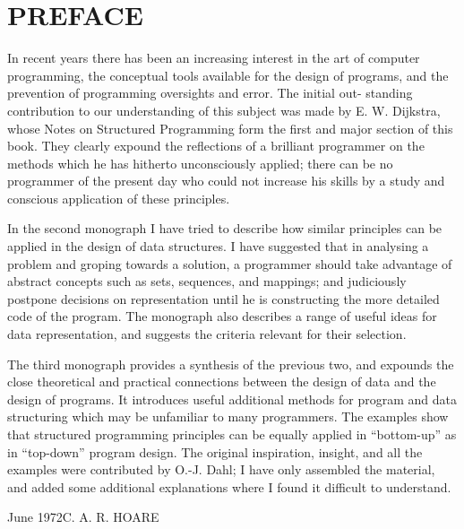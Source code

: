 \chapter*{PREFACE}
%

\noindent
In recent years there has been an increasing interest in the art of computer programming, the conceptual tools available for the design of programs, and the prevention of programming oversights and error. The initial out- standing contribution to our understanding of this subject was made by E. W. Dijkstra, whose Notes on Structured Programming form the first and major section of this book. They clearly expound the reflections of a brilliant programmer on the methods which he has hitherto unconsciously applied; there can be no programmer of the present day who could not increase his skills by a study and conscious application of these principles.

In the second monograph I have tried to describe how similar principles can be applied in the design of data structures. I have suggested that in analysing a problem and groping towards a solution, a programmer should take advantage of abstract concepts such as sets, sequences, and mappings; and judiciously postpone decisions on representation until he is constructing the more detailed code of the program. The monograph also describes a range of useful ideas for data representation, and suggests the criteria relevant for their selection.

The third monograph provides a synthesis of the previous two, and expounds the close theoretical and practical connections between the design of data and the design of programs. It introduces useful additional methods for program and data structuring which may be unfamiliar to many programmers. The examples show that structured programming principles can be equally applied in ``bottom-up'' as in ``top-down'' program design. The original inspiration, insight, and all the examples were contributed by O.-J. Dahl; I have only assembled the material, and added some additional explanations where I found it difficult to understand.
\bigskip
 
\noindent
June 1972\hfill C. A. R. HOARE
